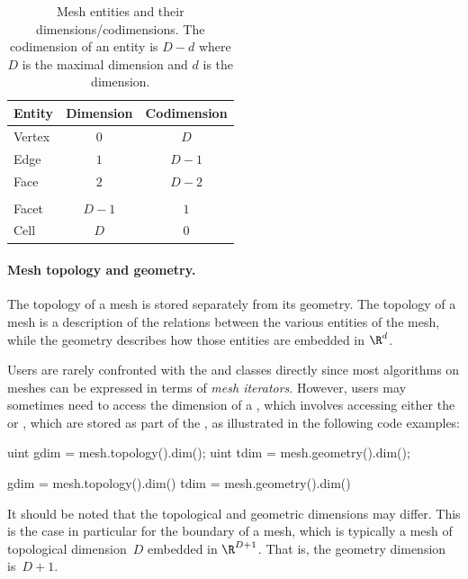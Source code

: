 \begin{table}
  \begin{center}
    \begin{tabular}{lcc}
      \toprule
      Entity & Dimension & Codimension \\
      \hline
      Vertex & $0$ & $D$ \\
      Edge & $1$ & $D-1$ \\
      Face & $2$ & $D-2$ \\
      & & \\
      Facet & $D-1$ & $1$ \\
      Cell & $D$ & $0$ \\
      \bottomrule
    \end{tabular}
    \caption{Mesh entities and their dimensions/codimensions. The
      codimension of an entity is $D - d$ where $D$ is the maximal
      dimension and $d$ is the dimension.}
  \end{center}
  \label{tab:logg-2:entities}
\end{table}

\paragraph{Mesh topology and geometry.}

The topology of a mesh is stored separately from its geometry. The
topology of a mesh is a description of the relations between the
various entities of the mesh, while the geometry describes how those
entities are embedded in $\R^d$.

Users are rarely confronted with the  and
 classes directly since most algorithms on meshes can be
expressed in terms of \emph{mesh iterators}. However, users may sometimes
need to access the dimension of a , which involves accessing
either the  or , which are stored
as part of the , as illustrated in the following code examples:
\begin{c++}
uint gdim = mesh.topology().dim();
uint tdim = mesh.geometry().dim();
\end{c++}
\begin{python}
gdim = mesh.topology().dim()
tdim = mesh.geometry().dim()
\end{python}
It should be noted that the topological and geometric dimensions may
differ. This is the case in particular for the boundary of a mesh,
which is typically a mesh of topological dimension~$D$ embedded in
$\R^{D+1}$. That is, the geometry dimension is~$D + 1$.

